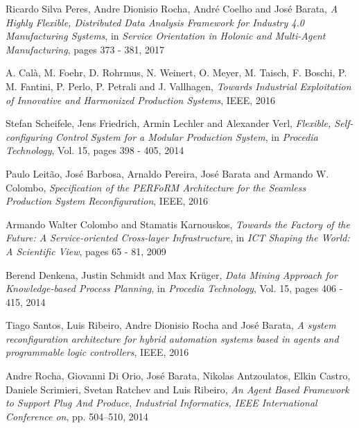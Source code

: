 \documentclass[conference,compsoc,hidelinks]{IEEEtran}
\begin{document}
\begin{thebibliography}{1}
	
Ricardo Silva Peres, Andre Dionisio Rocha, André Coelho and José Barata, \emph{A Highly Flexible, Distributed Data Analysis Framework for Industry 4.0 Manufacturing Systems}, in \emph{Service Orientation in Holonic and Multi-Agent Manufacturing}, pages 373 - 381, 2017

A. Calà, M. Foehr, D. Rohrmus, N. Weinert, O. Meyer, M. Taisch, F. Boschi, P. M. Fantini, P. Perlo, P. Petrali and J. Vallhagen, \emph{Towards Industrial Exploitation of Innovative and Harmonized Production Systems}, IEEE, 2016

Stefan Scheifele, Jens Friedrich, Armin Lechler and Alexander Verl, \emph{Flexible, Self-configuring Control System for a Modular Production System},
in \emph{Procedia Technology}, Vol. 15, pages 398 - 405, 2014

Paulo Leitão, José Barbosa, Arnaldo Pereira, José Barata  and Armando W. Colombo, \emph{Specification of the PERFoRM Architecture for the Seamless Production System Reconfiguration}, IEEE, 2016

Armando Walter Colombo and Stamatis Karnouskos,
\emph{Towards the Factory of the Future: A Service-oriented Cross-layer Infrastructure}, in \emph{ICT Shaping the World: A Scientific View}, pages 65 - 81, 2009

Berend Denkena, Justin Schmidt and Max Krüger,
\emph{Data Mining Approach for Knowledge-based Process Planning}, in \emph{Procedia Technology}, Vol. 15, pages 406 - 415, 2014

Tiago Santos, Luis Ribeiro, Andre Dionisio Rocha and José Barata, \emph{A system reconfiguration architecture for hybrid automation systems based in agents and programmable logic controllers}, IEEE, 2016

Andre Rocha, Giovanni Di Orio, José Barata, Nikolas Antzoulatos, Elkin Castro, Daniele Scrimieri, Svetan Ratchev and Luis Ribeiro,
\emph{An Agent Based Framework to Support Plug And Produce}, \emph{Industrial Informatics, IEEE International Conference on}, pp. 504–510, 2014

\end{thebibliography}

\end{document}

